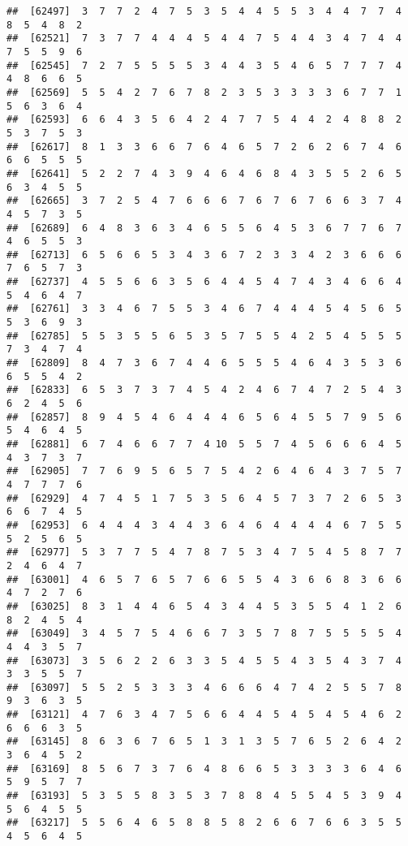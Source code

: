 \documentclass[
]{book}
\begin{document}
\begin{verbatim}
##  [62497]  3  7  7  2  4  7  5  3  5  4  4  5  5  3  4  4  7  7  4  8  5  4  8  2
##  [62521]  7  3  7  7  4  4  4  5  4  4  7  5  4  4  3  4  7  4  4  7  5  5  9  6
##  [62545]  7  2  7  5  5  5  5  3  4  4  3  5  4  6  5  7  7  7  4  4  8  6  6  5
##  [62569]  5  5  4  2  7  6  7  8  2  3  5  3  3  3  3  6  7  7  1  5  6  3  6  4
##  [62593]  6  6  4  3  5  6  4  2  4  7  7  5  4  4  2  4  8  8  2  5  3  7  5  3
##  [62617]  8  1  3  3  6  6  7  6  4  6  5  7  2  6  2  6  7  4  6  6  6  5  5  5
##  [62641]  5  2  2  7  4  3  9  4  6  4  6  8  4  3  5  5  2  6  5  6  3  4  5  5
##  [62665]  3  7  2  5  4  7  6  6  6  7  6  7  6  7  6  6  3  7  4  4  5  7  3  5
##  [62689]  6  4  8  3  6  3  4  6  5  5  6  4  5  3  6  7  7  6  7  4  6  5  5  3
##  [62713]  6  5  6  6  5  3  4  3  6  7  2  3  3  4  2  3  6  6  6  7  6  5  7  3
##  [62737]  4  5  5  6  6  3  5  6  4  4  5  4  7  4  3  4  6  6  4  5  4  6  4  7
##  [62761]  3  3  4  6  7  5  5  3  4  6  7  4  4  4  5  4  5  6  5  5  3  6  9  3
##  [62785]  5  5  3  5  5  6  5  3  5  7  5  5  4  2  5  4  5  5  5  7  3  4  7  4
##  [62809]  8  4  7  3  6  7  4  4  6  5  5  5  4  6  4  3  5  3  6  6  5  5  4  2
##  [62833]  6  5  3  7  3  7  4  5  4  2  4  6  7  4  7  2  5  4  3  6  2  4  5  6
##  [62857]  8  9  4  5  4  6  4  4  4  6  5  6  4  5  5  7  9  5  6  5  4  6  4  5
##  [62881]  6  7  4  6  6  7  7  4 10  5  5  7  4  5  6  6  6  4  5  4  3  7  3  7
##  [62905]  7  7  6  9  5  6  5  7  5  4  2  6  4  6  4  3  7  5  7  4  7  7  7  6
##  [62929]  4  7  4  5  1  7  5  3  5  6  4  5  7  3  7  2  6  5  3  6  6  7  4  5
##  [62953]  6  4  4  4  3  4  4  3  6  4  6  4  4  4  4  6  7  5  5  5  2  5  6  5
##  [62977]  5  3  7  7  5  4  7  8  7  5  3  4  7  5  4  5  8  7  7  2  4  6  4  7
##  [63001]  4  6  5  7  6  5  7  6  6  5  5  4  3  6  6  8  3  6  6  4  7  2  7  6
##  [63025]  8  3  1  4  4  6  5  4  3  4  4  5  3  5  5  4  1  2  6  8  2  4  5  4
##  [63049]  3  4  5  7  5  4  6  6  7  3  5  7  8  7  5  5  5  5  4  4  4  3  5  7
##  [63073]  3  5  6  2  2  6  3  3  5  4  5  5  4  3  5  4  3  7  4  3  3  5  5  7
##  [63097]  5  5  2  5  3  3  3  4  6  6  6  4  7  4  2  5  5  7  8  9  3  6  3  5
##  [63121]  4  7  6  3  4  7  5  6  6  4  4  5  4  5  4  5  4  6  2  6  6  6  3  5
##  [63145]  8  6  3  6  7  6  5  1  3  1  3  5  7  6  5  2  6  4  2  3  6  4  5  2
##  [63169]  8  5  6  7  3  7  6  4  8  6  6  5  3  3  3  3  6  4  6  5  9  5  7  7
##  [63193]  5  3  5  5  8  3  5  3  7  8  8  4  5  5  4  5  3  9  4  5  6  4  5  5
##  [63217]  5  5  6  4  6  5  8  8  5  8  2  6  6  7  6  6  3  5  5  4  5  6  4  5

\end{verbatim}
\end{document}
